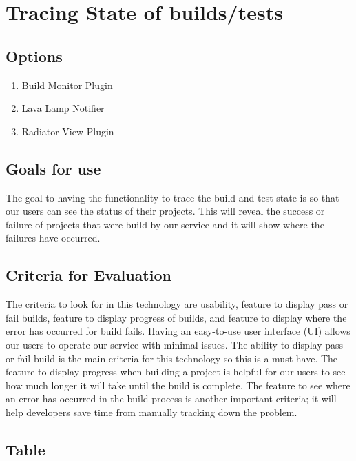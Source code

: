 \documentclass[10pt,letterpaper,onecolumn,journal]{IEEEtran}
\begin{document}
\section{Tracing State of builds/tests}
\subsection{Options}
\begin{enumerate}
  \item Build Monitor Plugin
  \item Lava Lamp Notifier
  \item Radiator View Plugin
\end{enumerate}
\subsection{Goals for use}
The goal to having the functionality to trace the build and test state is so that our users can see the status of their projects.
This will reveal the success or failure of projects that were build by our service and it will show where the failures have occurred.
\subsection{Criteria for Evaluation}
The criteria to look for in this technology are usability, feature to display pass or fail builds, feature to display progress of builds, and feature to display where the error has occurred for build fails.
Having an easy-to-use user interface (UI) allows our users to operate our service with minimal issues.
The ability to display pass or fail build is the main criteria for this technology so this is a must have.
The feature to display progress when building a project is helpful for our users to see how much longer it will take until the build is complete.
The feature to see where an error has occurred in the build process is another important criteria; it will help developers save time from manually tracking down the problem.
\subsection{Table}
\end{document}
